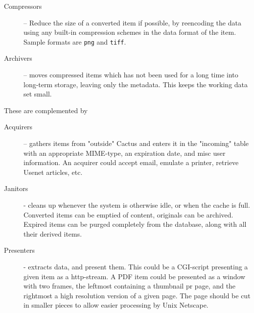 \begin{description}
\item[Compressors] -- Reduce the size of a converted item if possible,
by reencoding the data using any built-in compression schemes in the
data format of the item.  Sample formats are \texttt{png} and
\texttt{tiff}.
  
  
\item[Archivers] -- moves compressed items which has not been used for
a long time into long-term storage, leaving only the metadata.  This
keeps the working data set small.

  

\end{description}

These are complemented by

\begin{description}
\item[Acquirers] -- gathers items from "outside" Cactus and enters it
in the "incoming" table with an appropriate MIME-type, an expiration
date, and \textsf{misc user information}.  An acquirer could accept
email, emulate a printer, retrieve Usenet articles, etc.

\item[Janitors] - cleans up whenever the system is otherwise idle, or
  when the cache is full.  Converted items can be emptied of content,
  originals can be archived.  Expired items can be purged completely
  from the database, along with all their derived items.

\item[Presenters] - extracts data, and present them.  This could be a
  CGI-script presenting a given item as a http-stream.  A PDF item
  could be presented as a window with two frames, the leftmost
  containing a thumbnail pr page, and the rightmost a high resolution
  version of a given page.  The page should be cut in smaller pieces
  to allow easier processing by Unix Netscape.
\end{description}

